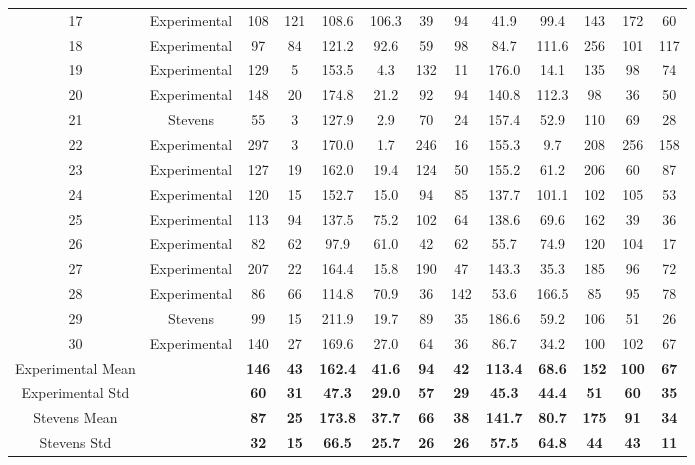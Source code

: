\begin{table}[!ht]
{\begin{tabular}{|c|c|c|c|c|c|c|c|c|c|c|c|c|}
17 & Experimental & 108 & 121 & 108.6 & 106.3 & 39 & 94 & 41.9 & 99.4 & 143 & 172 & 60 \\
18 & Experimental & 97 & 84 & 121.2 & 92.6 & 59 & 98 & 84.7 & 111.6 & 256 & 101 & 117 \\
19 & Experimental & 129 & 5 & 153.5 & 4.3 & 132 & 11 & 176.0 & 14.1 & 135 & 98 & 74 \\
20 & Experimental & 148 & 20 & 174.8 & 21.2 & 92 & 94 & 140.8 & 112.3 & 98 & 36 & 50 \\
21 & Stevens & 55 & 3 & 127.9 & 2.9 & 70 & 24 & 157.4 & 52.9 & 110 & 69 & 28 \\
22 & Experimental & 297 & 3 & 170.0 & 1.7 & 246 & 16 & 155.3 & 9.7 & 208 & 256 & 158 \\
23 & Experimental & 127 & 19 & 162.0 & 19.4 & 124 & 50 & 155.2 & 61.2 & 206 & 60 & 87 \\
24 & Experimental & 120 & 15 & 152.7 & 15.0 & 94 & 85 & 137.7 & 101.1 & 102 & 105 & 53 \\
25 & Experimental & 113 & 94 & 137.5 & 75.2 & 102 & 64 & 138.6 & 69.6 & 162 & 39 & 36 \\
26 & Experimental & 82 & 62 & 97.9 & 61.0 & 42 & 62 & 55.7 & 74.9 & 120 & 104 & 17 \\
27 & Experimental & 207 & 22 & 164.4 & 15.8 & 190 & 47 & 143.3 & 35.3 & 185 & 96 & 72 \\
28 & Experimental & 86 & 66 & 114.8 & 70.9 & 36 & 142 & 53.6 & 166.5 & 85 & 95 & 78 \\
29 & Stevens & 99 & 15 & 211.9 & 19.7 & 89 & 35 & 186.6 & 59.2 & 106 & 51 & 26 \\
30 & Experimental & 140 & 27 & 169.6 & 27.0 & 64 & 36 & 86.7 & 34.2 & 100 & 102 & 67 \\
\rowcolor{lightgray} Experimental Mean &  & \textbf{146} & \textbf{43} & \textbf{162.4} & \textbf{41.6} & \textbf{94} & \textbf{42} & \textbf{113.4} & \textbf{68.6} & \textbf{152} & \textbf{100} & \textbf{67} \\
\rowcolor{lightgray} Experimental Std &  & \textbf{60} & \textbf{31} & \textbf{47.3} & \textbf{29.0} & \textbf{57} & \textbf{29} & \textbf{45.3} & \textbf{44.4} & \textbf{51} & \textbf{60} & \textbf{35} \\
\rowcolor{lightgray} Stevens Mean &  & \textbf{87} & \textbf{25} & \textbf{173.8} & \textbf{37.7} & \textbf{66} & \textbf{38} & \textbf{141.7} & \textbf{80.7} & \textbf{175} & \textbf{91} & \textbf{34} \\
\rowcolor{lightgray} Stevens Std &  & \textbf{32} & \textbf{15} & \textbf{66.5} & \textbf{25.7} & \textbf{26} & \textbf{26} & \textbf{57.5} & \textbf{64.8} & \textbf{44} & \textbf{43} & \textbf{11} \\
\hline
\end{tabular}}
\end{table}
